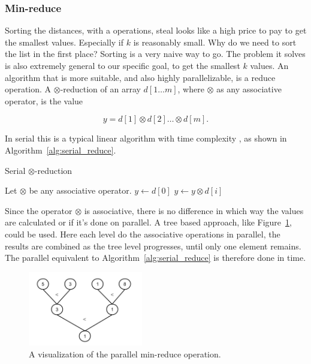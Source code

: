 
\subsubsection{Min-reduce} %
\label{ssub:min_reduce}

Sorting the distances, with a  operations, steal looks like a high price to pay to get the smallest values. Especially if $k$ is reasonably small. Why do we need to sort the list in the first place? Sorting is a very naive way to go. The problem it solves is also extremely general to our specific goal, to get the smallest $k$ values. An algorithm that is more suitable, and also highly parallelizable, is a reduce operation. A $\otimes$-reduction of an array $d[1 \dots m]$, where $\otimes$ as any associative operator, is the value

     $$ y = d[1] \otimes d[2] \dots \otimes d[m].$$\cite{Cormen:2001}

In serial this is a typical linear algorithm with time complexity , as shown in Algorithm~\ref{alg:serial_reduce}. 

\begin{algorithm}[ht]
\caption{Serial $\otimes$-reduction}
\label{alg:serial_reduce}
\begin{algorithmic}
    \State Let $\otimes$ be any associative operator.
        \State $y \gets d[0]$
            \State $y \gets y \otimes d[i]$
        \EndFor
    \EndFunction
\end{algorithmic}
\end{algorithm}

Since the operator $\otimes$ is associative, there is no difference in which way the values are calculated or if it's done on parallel. A tree based approach, like Figure~\ref{fig:paralell_reduce_operation}, could be used. Here each level do the associative operations in parallel, the results are combined as the tree level progresses, until only one element remains. The parallel equivalent to Algorithm~\ref{alg:serial_reduce} is therefore done in  time. 

\begin{figure}[ht!]
\centering
\includegraphics[width=50mm]{../gfx/min_reduce.png}

\caption{A visualization of the parallel min-reduce operation.}
\label{fig:paralell_reduce_operation}
\end{figure}

